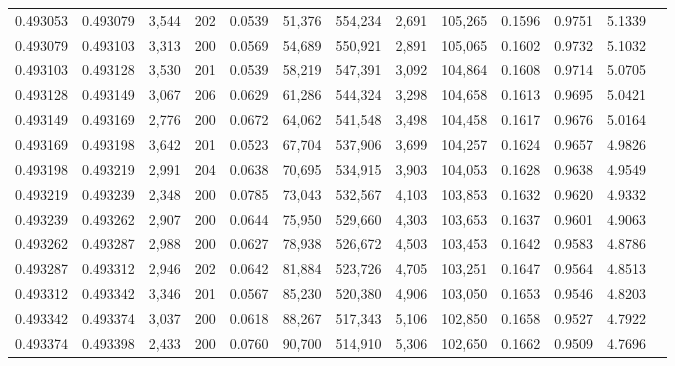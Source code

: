 \begin{tabular}{rrrrrrrrrrrrr}
0.493053 & 0.493079 & 3,544 & 202 &                                     0.0539 &  51,376 & 554,234 &   2,691 & 105,265 & 0.1596 & 0.9751 & 5.1339 \\
0.493079 & 0.493103 & 3,313 & 200 &                                     0.0569 &  54,689 & 550,921 &   2,891 & 105,065 & 0.1602 & 0.9732 & 5.1032 \\
0.493103 & 0.493128 & 3,530 & 201 &                                     0.0539 &  58,219 & 547,391 &   3,092 & 104,864 & 0.1608 & 0.9714 & 5.0705 \\
0.493128 & 0.493149 & 3,067 & 206 &                                     0.0629 &  61,286 & 544,324 &   3,298 & 104,658 & 0.1613 & 0.9695 & 5.0421 \\
0.493149 & 0.493169 & 2,776 & 200 &                                     0.0672 &  64,062 & 541,548 &   3,498 & 104,458 & 0.1617 & 0.9676 & 5.0164 \\
0.493169 & 0.493198 & 3,642 & 201 &                                     0.0523 &  67,704 & 537,906 &   3,699 & 104,257 & 0.1624 & 0.9657 & 4.9826 \\
0.493198 & 0.493219 & 2,991 & 204 &                                     0.0638 &  70,695 & 534,915 &   3,903 & 104,053 & 0.1628 & 0.9638 & 4.9549 \\
0.493219 & 0.493239 & 2,348 & 200 &                                     0.0785 &  73,043 & 532,567 &   4,103 & 103,853 & 0.1632 & 0.9620 & 4.9332 \\
0.493239 & 0.493262 & 2,907 & 200 &                                     0.0644 &  75,950 & 529,660 &   4,303 & 103,653 & 0.1637 & 0.9601 & 4.9063 \\
0.493262 & 0.493287 & 2,988 & 200 &                                     0.0627 &  78,938 & 526,672 &   4,503 & 103,453 & 0.1642 & 0.9583 & 4.8786 \\
0.493287 & 0.493312 & 2,946 & 202 &                                     0.0642 &  81,884 & 523,726 &   4,705 & 103,251 & 0.1647 & 0.9564 & 4.8513 \\
0.493312 & 0.493342 & 3,346 & 201 &                                     0.0567 &  85,230 & 520,380 &   4,906 & 103,050 & 0.1653 & 0.9546 & 4.8203 \\
0.493342 & 0.493374 & 3,037 & 200 &                                     0.0618 &  88,267 & 517,343 &   5,106 & 102,850 & 0.1658 & 0.9527 & 4.7922 \\
0.493374 & 0.493398 & 2,433 & 200 &                                     0.0760 &  90,700 & 514,910 &   5,306 & 102,650 & 0.1662 & 0.9509 & 4.7696 \\

\end{tabular}
